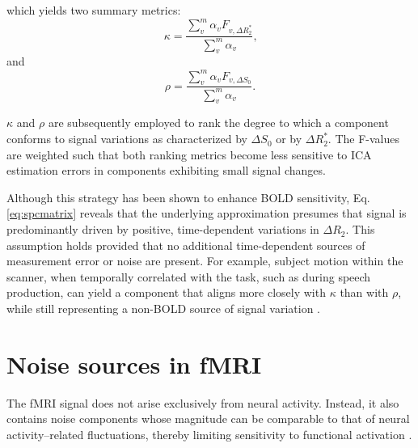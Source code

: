 which yields two summary metrics:
\begin{equation}
    \kappa=\frac{\sum _v ^m \alpha _vF_{v,\Delta R_2^*}}{\sum _v ^m \alpha _v}\text{,}
\end{equation}
and
\begin{equation}
    \rho=\frac{\sum _v ^m \alpha _vF_{v,\Delta S_0}}{\sum _v ^m \alpha _v}\text{.}
\end{equation}

$\kappa$ and $\rho$ are subsequently employed to rank the degree to which a component conforms to signal variations as characterized by $\Delta S_0$ or by $\Delta R_2^*$. The F-values are weighted such that both ranking metrics become less sensitive to ICA estimation errors in components exhibiting small signal changes. 

Although this strategy has been shown to enhance BOLD sensitivity, Eq. \ref{eq:spcmatrix} reveals that the underlying approximation presumes that signal is predominantly driven by positive, time-dependent variations in $\Delta R_2$. This assumption holds provided that no additional time-dependent sources of measurement error or noise are present. For example, subject motion within the scanner, when temporally correlated with the task, such as during speech production, can yield a component that aligns more closely with $\kappa$ than with $\rho$, while still representing a non-BOLD source of signal variation \citep{reddyDenoisingTaskcorrelatedHead2024,moia2021ica}.



\section{Noise sources in fMRI}
\label{sec:noiseMRI}

The fMRI signal does not arise exclusively from neural activity. Instead, it also contains noise components whose magnitude can be comparable to that of neural activity–related fluctuations, thereby limiting sensitivity to functional activation \citep{liu2016noise, jorgeSignalFluctuationsFMRI2013, bianciardiSourcesFunctionalMagnetic2009}.

